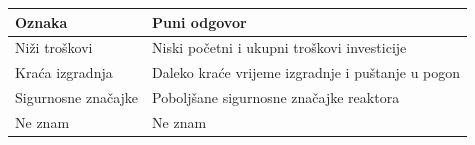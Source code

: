 \begin{tabular}{ll}
\toprule
Oznaka & Puni odgovor \\
\midrule
Niži troškovi & Niski početni i ukupni troškovi investicije \\
Kraća izgradnja & Daleko kraće vrijeme izgradnje i puštanje u pogon \\
Sigurnosne značajke & Poboljšane sigurnosne značajke reaktora \\
Ne znam & Ne znam \\
\bottomrule
\end{tabular}
